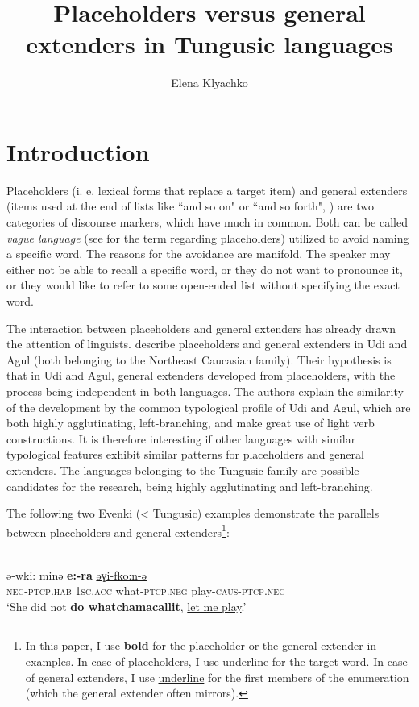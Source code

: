 \documentclass[output=paper,colorlinks,citecolor=brown
\ChapterDOI{10.5281/zenodo.15697577}
]{langscibook}
\author{Elena Klyachko\orcid{}\affiliation{Higher School of
Economics, Moscow}}
\title{Placeholders versus general extenders in Tungusic languages}
\begin{document}
\maketitle
\label{chap:klyachko}
\section{Introduction}
{Placeholders} (i. e. lexical forms that replace a {target} item) and {general extenders} (items used at the end of lists like ``and so on" or ``and so forth", \citealt{overstreet2021general}) are two categories of discourse markers, which have much in common. Both can be called \textit{vague language} (see \citealt{tarnyikova2019english} for the term regarding placeholders) utilized to avoid naming a specific word. The reasons for the avoidance are manifold. The speaker may either not be able to recall a specific word, or they do not want to pronounce it, or they would like to refer to some open-ended list without specifying the exact word.

The interaction between placeholders and general extenders has already drawn the attention of linguists. \citet{ganenkov2010interrogatives} describe placeholders and general extenders in Udi and Agul (both belonging to the Northeast Caucasian family). Their hypothesis is that in Udi and Agul, general extenders developed from placeholders, with the process being independent in both languages. The authors explain the similarity of the development by the common typological profile of Udi and Agul, which are both highly agglutinating, left-branching, and make great use of light verb constructions. It is therefore interesting if other languages with similar typological features exhibit similar patterns for placeholders and general extenders. The languages belonging to the Tungusic family are possible candidates for the research, being highly agglutinating and left-branching.

The following two Evenki (< Tungusic) examples demonstrate the parallels between placeholders and general extenders\footnote{In this paper, I use \textbf{bold} for the placeholder or the general extender in examples. In case of placeholders, I use \uline{underline} for the target word. In case of general extenders, I use \uline{underline} for the first members of the enumeration (which the general extender often mirrors).}:
\ea

\label{ex:klyachko:1.1}
\\
\gll ə-wki:		minə		\textbf{e:-ra}		\uline{əɣi-fko:n-ə}\\
 \textsc{neg}-\textsc{ptcp.hab} \textsc{1sc.acc} what-\textsc{ptcp.neg} play-\textsc{caus}-\textsc{ptcp.neg}\\
\glt `She did not \textbf{ do whatchamacallit}, \uline{let me play}.'
\z
{}
\end{document}
